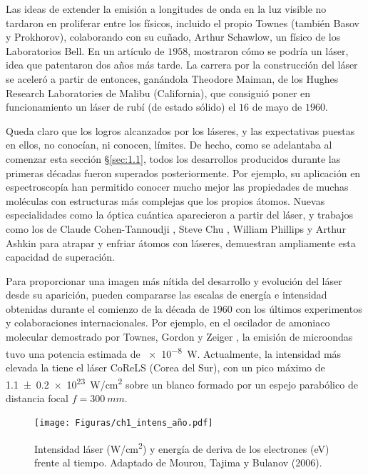 Las ideas de extender la emisión a longitudes de onda en la luz visible no tardaron en proliferar entre los físicos, incluido el propio Townes (también Basov y Prokhorov), colaborando con su cuñado, Arthur Schawlow, un físico de los Laboratorios Bell. En un artículo de $1958$\autocite{Schawlow1958}, mostraron cómo se podría un láser, idea que patentaron dos años más tarde. La carrera por la construcción del láser se aceleró a partir de entonces, ganándola Theodore Maiman, de los Hughes Research Laboratories de Malibu (California), que consiguió poner en funcionamiento un láser de rubí (de estado sólido) \autocite{Maiman1960} el $16$ de mayo de $1960$.

Queda claro que los logros alcanzados por los láseres, y las expectativas puestas en ellos, no conocían, ni conocen, límites. De hecho, como se adelantaba al comenzar esta sección \S\ref{sec:1.1}, todos los desarrollos producidos durante las primeras décadas fueron superados posteriormente. Por ejemplo, su aplicación en espectroscopía han permitido conocer mucho mejor las propiedades de muchas moléculas con estructuras más complejas que los propios átomos. Nuevas especialidades como la óptica cuántica aparecieron a partir del láser, y trabajos como los de Claude Cohen-Tannoudji \autocite{Dalibard1985}, Steve Chu \autocite{Raab1987,Chu1986}, William Phillips \autocite{Migdall1985} y Arthur Ashkin \autocite{Ashkin1978,Ashkin1970} para atrapar y enfriar átomos con láseres, demuestran ampliamente esta capacidad de superación.

Para proporcionar una imagen más nítida del desarrollo y evolución del láser desde su aparición, pueden compararse las escalas de energía e intensidad obtenidas durante el comienzo de la década de $1960$ con los últimos experimentos y colaboraciones internacionales. Por ejemplo, en el oscilador de amoniaco molecular demostrado por Townes, Gordon y Zeiger \autocite{Gordon1954}, la emisión de microondas tuvo una potencia estimada de \qty{e-8}{W}. Actualmente, la intensidad más elevada la tiene el láser CoReLS \autocite{Yoon2021} (Corea del Sur), con un pico máximo de \qty{1.1 +- 0.2 e23}{W/cm^2} sobre un blanco formado por un espejo parabólico de distancia focal $f = \qty{300}{mm}$. 

\begin{figure}[htbp]
  \centering
  \texttt{[image: Figuras/ch1\_intens\_año.pdf]}
  \caption{Intensidad láser (\unit{W/cm^2}) y energía de deriva de los electrones (\unit{eV}) frente al tiempo. Adaptado de Mourou, Tajima y Bulanov (2006)\autocite{Mourou2006}.}
  \label{fig:ch1_intens}
\end{figure}

